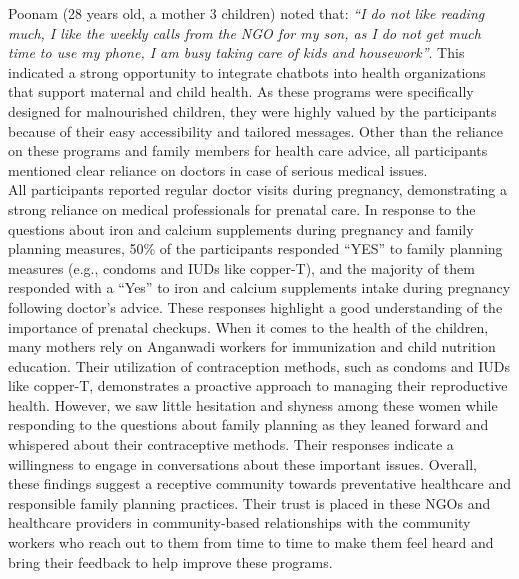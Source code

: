 Poonam (28 years old, a mother 3 children) noted that: \textit{``I do not like reading much, I like the weekly calls from the NGO for my son, as I do not get much time to use my phone, I am busy taking care of kids and housework''}. %
This indicated a strong opportunity to integrate chatbots into health organizations that support maternal and child health. As these programs were specifically designed for malnourished children, they were highly valued by the participants because of their easy accessibility and tailored messages. Other than the reliance on these programs and family members for health care advice, all participants mentioned clear reliance on doctors in case of serious medical issues. \\
All participants reported regular doctor visits during pregnancy, demonstrating a strong reliance on medical professionals for prenatal care. In response to the questions about iron and calcium supplements during pregnancy and family planning measures, 50\% of the participants responded ``YES'' to family planning measures (e.g., condoms and IUDs like copper-T), and the majority of them responded with a ``Yes'' to iron and calcium supplements intake during pregnancy following doctor's advice. These responses highlight a good understanding of the importance of prenatal checkups. When it comes to the health of the children, many mothers rely on Anganwadi workers for immunization and child nutrition education. Their utilization of contraception methods, such as condoms and IUDs like copper-T, demonstrates a proactive approach to managing their reproductive health. 
However, we saw little hesitation and shyness among these women while responding to the questions about family planning as they leaned forward and whispered about their contraceptive methods. Their responses indicate a willingness to engage in conversations about these important issues. Overall, these findings suggest a receptive community towards preventative healthcare and responsible family planning practices. Their trust is placed in these NGOs and healthcare providers in community-based relationships with the community workers who reach out to them from time to time to make them feel heard and bring their feedback to help improve these programs.

